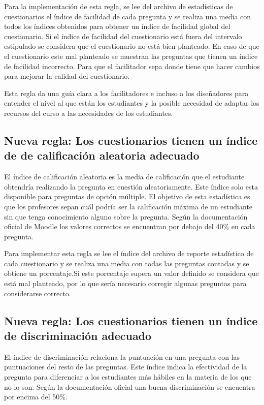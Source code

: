Para la implementación de esta regla, se lee del archivo de estadísticas de cuestionarios el índice de facilidad de cada pregunta y se realiza una media con todos los índices obtenidos para obtener un índice de facilidad global del cuestionario. Si el índice de facilidad del cuestionario está fuera del intervalo estipulado se considera que el cuestionario no está bien planteado. En caso de que el cuestionario este mal planteado se muestran las preguntas que tienen un índice de facilidad incorrecto. Para que el facilitador sepa donde tiene que hacer cambios para mejorar la calidad del cuestionario.

Esta regla da una guía clara a los facilitadores e incluso a los diseñadores para entender el nivel al que están los estudiantes y la posible necesidad de adaptar los recursos del curso a las necesidades de los estudiantes. 

\subsection{Nueva regla: Los cuestionarios tienen un índice de de calificación aleatoria adecuado}
El índice de calificación aleatoria es la media de calificación que el estudiante obtendría realizando la pregunta en cuestión aleatoriamente. Este índice solo esta disponible para preguntas de opción múltiple. El objetivo de esta estadística es que los profesores sepan cuál podría ser la calificación máxima de un estudiante sin que tenga conocimiento alguno sobre la pregunta. Según la documentación oficial de Moodle \cite{estadisticas-examen} los valores correctos se encuentran por debajo del 40\% en cada pregunta.

Para implementar esta regla se lee el índice del archivo de reporte estadístico de cada cuestionario y se realiza una media con todas las preguntas contadas y se obtiene un porcentaje.Si este porcentaje supera un valor definido se considera que está mal planteado, por lo que sería necesario corregir algunas preguntas para considerarse correcto.

\subsection{Nueva regla: Los cuestionarios tienen un índice de discriminación adecuado}
El índice de discriminación relaciona la puntuación en una pregunta con las puntuaciones del resto de las preguntas. Este índice indica la efectividad de la pregunta para diferenciar a los estudiantes más hábiles en la materia de los que no lo son. Según la documentación oficial \cite{estadisticas-examen} una buena discriminación se encuentra por encima del 50\%.

